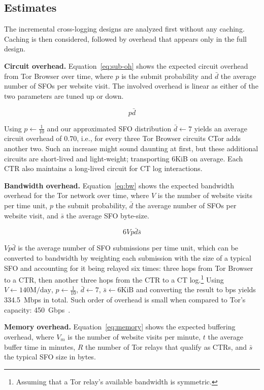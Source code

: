 \subsection{Estimates}
The incremental cross-logging designs are analyzed first without any caching.
Caching is then considered, followed by overhead that appears only in the full
design.

\textbf{Circuit overhead.}
Equation~\ref{eq:sub-oh} shows the expected circuit overhead from Tor Browser
over time, where $p$ is the submit probability and $\bar{d}$ the average number
of SFOs per website visit.  The involved overhead is linear as either of the two
parameters are tuned up or down.

\begin{equation} \label{eq:sub-oh}
	p\bar{d}
\end{equation}

Using $p\gets\frac{1}{10}$ and our approximated SFO distribution $\bar{d}\gets7$
yields an average circuit overhead of $0.70$, i.e., for every three Tor Browser
circuits CTor adds another two.  Such an increase might sound
daunting at first, but these additional circuits are short-lived and
light-weight; transporting 6KiB on average.  Each CTR also maintains a 
long-lived circuit for CT log interactions.

\textbf{Bandwidth overhead.}  Equation~\ref{eq:bw} shows the expected
bandwidth overhead for the Tor network over time, where
	$V$ is the number of website visits per time unit,
	$p$ the submit probability,
	$\bar{d}$ the average number of SFOs per website visit, and
	$\bar{s}$ the average SFO byte-size.

\begin{equation} \label{eq:bw}
	6Vp\bar{d}\bar{s}
\end{equation}

$Vp\bar{d}$ is the average number of SFO submissions per time unit, which can be
converted to bandwidth by weighting each submission with the size of
a typical SFO and accounting for it being relayed six times:
	three hops from Tor Browser to a CTR, then
	another three hops from the CTR to a CT log.\footnote{%
		Assuming that a Tor relay's available bandwidth is symmetric.
	}
Using
	$V\gets 140\textrm{M/day}$,
	$p \gets \frac{1}{10}$,
	$\bar{d} \gets 7$,
	$\bar{s} \gets 6\textrm{KiB}$
and converting the result to bps yields 334.5~Mbps in total.  Such order of
overhead is small when compared to Tor's capacity:
450~Gbps~\cite{tor-bandwidth}.

\textbf{Memory overhead.}
Equation~\ref{eq:memory} shows the expected buffering overhead, where
	$V_m$ is the number of website visits per minute,
	$t$ the average buffer time in minutes,
	$R$ the number of Tor relays that qualify as CTRs, and
	$\bar{s}$ the typical SFO size in bytes.

